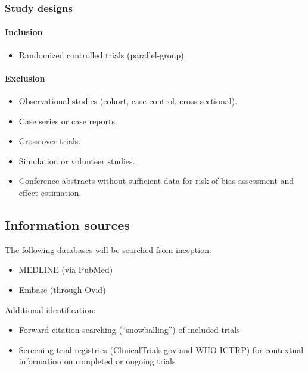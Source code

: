 \documentclass[11pt]{article}
\begin{document}
\subsubsection{Study designs}

\paragraph{Inclusion}

\begin{itemize}
  \item Randomized controlled trials (parallel-group).
\end{itemize}

\paragraph{Exclusion}

\begin{itemize}
  \item Observational studies (cohort, case-control, cross-sectional).
  \item Case series or case reports.
  \item Cross-over trials.
  \item Simulation or volunteer studies.
  \item Conference abstracts without sufficient data for risk of bias assessment and effect estimation.
\end{itemize}

\subsection{Information sources}

The following databases will be searched from inception:

\begin{itemize}
  \item MEDLINE (via PubMed)
  \item Embase (through Ovid)
\end{itemize}

Additional identification:

\begin{itemize}
  \item Forward citation searching (“snowballing”) of included trials
  \item Screening trial registries (ClinicalTrials.gov and WHO ICTRP) for contextual information on completed or ongoing trials
\end{itemize}
\end{document}
